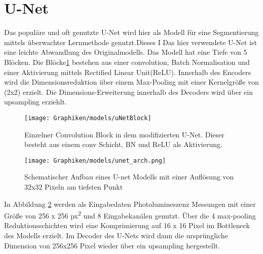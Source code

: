 \section{U-Net}
\label{ansatz:unet}
	Das populäre und oft genutzte U-Net \cite{UNETRonneberger2015} wird hier als Modell für eine Segmentierung mittels überwachter Lernmethode genutzt.Dieses I
	Das hier verwendete U-Net ist eine leichte Abwandlung des Originalmodells. Das Modell hat eine Tiefe von 5 Blöcken. Die Blöcke\ref{fig:u_net_block} bestehen aus einer convolution, Batch Normalisation und einer Aktivierung mittels Rectified Linear Unit(ReLU). Innerhalb des Encoders wird die Dimensionsreduktion über einem Max-Pooling mit einer Kernelgröße von (2x2) erzielt. Die Dimensions-Erweiterung innerhalb des Decoders wird über ein upsampling erziehlt.

		\begin{figure}[h!]
			\centering
			\texttt{[image: Graphiken/models/uNetBlock]}
			\caption{Einzelner Convolution Block in dem modifizierten U-Net. Dieser besteht aus einem conv Schicht, BN und ReLU als Aktivierung.}
			\label{fig:u_net_block}
	 	\end{figure}
 	
		\begin{figure}[h!]
			\centering
			\texttt{[image: Graphiken/models/unet\_arch.png]}
			\caption{Schematischer Aufbau eines U-net Modells mit einer Auflösung von 32x32 Pixeln am tiefsten Punkt}
			\label{fig:unet_arch}
		\end{figure}
		
		In Abbildung \ref{fig:unet_arch} werden als Eingabedaten Photolumineszenz Messungen mit einer Größe von 256 x 256 px\textsuperscript{2} und 8 Eingabekanälen genutzt. Über die 4 max-pooling Reduktionsschichten wird eine Komprimierung auf 16 x 16 Pixel im Bottleneck des Modells erzielt. Im Decoder des U-Nets wird dann die ursprüngliche Dimension von 256x256 Pixel wieder über ein upsampling hergestellt.
		
		
		
	\newpage
		
